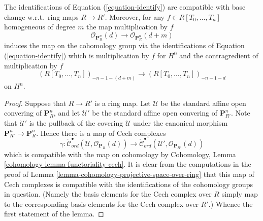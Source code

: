 \begin{lemma}
\label{lemma-identify-functorially}
The identifications of Equation (\ref{equation-identify}) are
compatible with base change w.r.t.\ ring maps $R \to R'$.
Moreover, for any $f \in R[T_0, \ldots, T_n]$ homogeneous
of degree $m$ the map multiplication by $f$
$$
\mathcal{O}_{\mathbf{P}^n_R}(d)
\longrightarrow
\mathcal{O}_{\mathbf{P}^n_R}(d + m)
$$
induces the map on the cohomology group via the identifications
of Equation (\ref{equation-identify}) which is multiplication by
$f$ for $H^0$ and the contragredient of multiplication by $f$
$$
(R[T_0, \ldots, T_n])_{-n - 1 - (d + m)}
\longrightarrow
(R[T_0, \ldots, T_n])_{-n - 1 - d}
$$
on $H^n$.
\end{lemma}

\begin{proof}
Suppose that $R \to R'$ is a ring map.
Let $\mathcal{U}$ be the standard affine open convering of $\mathbf{P}^n_R$,
and let $\mathcal{U}'$ be the standard affine open convering of
$\mathbf{P}^n_{R'}$. Note that $\mathcal{U}'$ is the pullback of the covering
$\mathcal{U}$ under the canonical morphism
$\mathbf{P}^n_{R'} \to \mathbf{P}^n_R$. Hence there
is a map of Cech complexes
$$
\gamma :
\check{\mathcal{C}}_{ord}^\bullet(\mathcal{U},
\mathcal{O}_{\mathbf{P}_R}(d))
\longrightarrow
\check{\mathcal{C}}_{ord}^\bullet(\mathcal{U}',
\mathcal{O}_{\mathbf{P}_{R'}}(d))
$$
which is compatible with the map on cohomology by
Cohomology, Lemma \ref{cohomology-lemma-functoriality-cech}.
It is clear from the computations in the proof of
Lemma \ref{lemma-cohomology-projective-space-over-ring}
that this map of Cech complexes is compatible with the identifications
of the cohomology groups in question. (Namely the basis elements for
the Cech complex over $R$ simply map to the corresponding basis elements
for the Cech complex over $R'$.) Whence the first statement of the lemma.


\end{proof}
